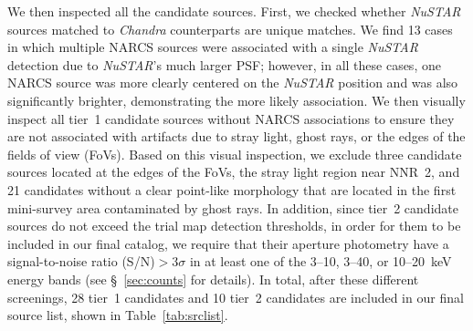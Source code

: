 \documentclass[iop,revtex4]{emulateapj}
\begin{document}
We then inspected all the candidate sources.  First, we checked whether \textit{NuSTAR} sources matched to \textit{Chandra} counterparts are unique matches.  We find 13 cases in which multiple NARCS sources were associated with a single \textit{NuSTAR} detection due to \textit{NuSTAR}'s much larger PSF; however, in all these cases, one NARCS source was more clearly centered on the \textit{NuSTAR} position and was also significantly brighter, demonstrating the more likely association.  We then visually inspect all tier~1 candidate sources without NARCS associations to ensure they are not associated with artifacts due to stray light, ghost rays, or the edges of the fields of view (FoVs).  Based on this visual inspection, we exclude three candidate sources located at the edges of the FoVs, the stray light region near NNR~2, and 21 candidates without a clear point-like morphology that are located in the first mini-survey area contaminated by ghost rays.  In addition, since tier~2 candidate sources do not exceed the trial map detection thresholds, in order for them to be included in our final catalog, we require that their aperture photometry have a signal-to-noise ratio (S/N)$>3\sigma$ in at least one of the 3--10, 3--40, or 10--20~keV energy bands (see \S~\ref{sec:counts} for details).  In total, after these different screenings, 28 tier~1 candidates and 10 tier~2 candidates are included in our final source list, shown in Table~\ref{tab:srclist}.  \par
\end{document}
